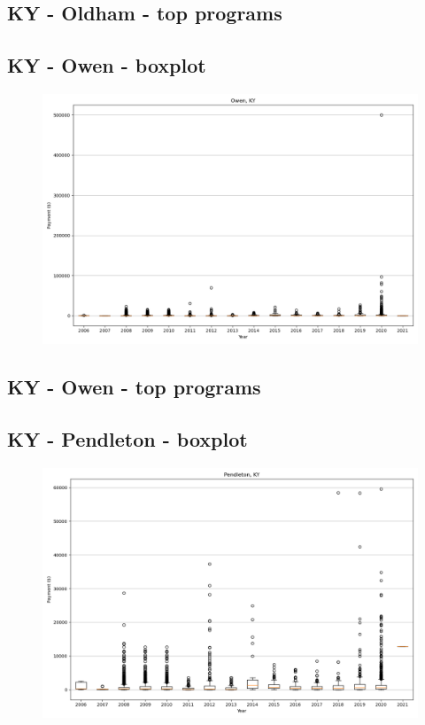 \subsection*{KY - Oldham - top programs}

\newpage
\subsection*{KY - Owen - boxplot}
\begin{figure}[h]
\centering
\includegraphics[width=7in]{../output/boxplots/counties/Owen-KY_boxplot.png}
\end{figure}


\subsection*{KY - Owen - top programs}

\newpage
\subsection*{KY - Pendleton - boxplot}
\begin{figure}[h]
\centering
\includegraphics[width=7in]{../output/boxplots/counties/Pendleton-KY_boxplot.png}
\end{figure}


